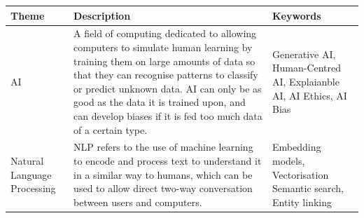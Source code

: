 \documentclass[12pt]{report}
\begin{document}
\pagebreak
    \begin{table}[H]
        \centering
        \begin{tabular}{|p{}|p{} | p{}|}
            \hline
            \cellcolor{blue!25}Theme & \cellcolor{blue!25}Description &
            \cellcolor{blue!25}Keywords \\

            \hline

            AI & A field of computing dedicated to allowing computers to simulate human
            learning by training them on large amounts of data so that they can recognise patterns to classify or 
            predict unknown data. AI can only be as good as the data it is trained upon, and can 
            develop biases if it is fed too much data of a certain type. & Generative AI, 
            Human-Centred AI, Explaianble AI, AI Ethics, AI Bias \\



            \hline

            Natural Language Processing & NLP refers to the use of machine learning to encode and 
            process text to understand it in a similar way to humans, which can be used to allow direct 
            two-way conversation between users and computers. & Embedding models, Vectorisation
            Semantic search, Entity linking


\end{tabular}
\end{table}
\end{document}

